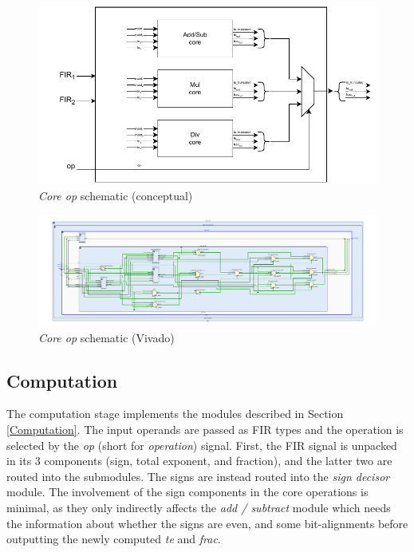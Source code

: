 \begin{figure}
    \centering
        \centering
        \includegraphics[width=\textwidth]{figures/core_op.drawio.pdf}
        \caption{\textit{Core op} schematic (conceptual)}
        \label{fig:core_op_ppu_schematic}
\end{figure}   


\begin{figure}
        \centering
        \includegraphics[width=\textwidth]{figures/core_op.vivado.pdf}
        \caption{\textit{Core op} schematic (Vivado)}
        \label{fig:core_op_ppu_schematic_vivado}
\end{figure}   




\subsection{Computation}


The computation stage implements the modules described in Section \ref{Computation}.
The input operands are passed as FIR types and the operation is selected by the \textit{op} (short for \textit{operation}) signal.
First, the FIR signal is unpacked in its 3 components (sign, total exponent, and fraction), and the latter two are routed into the submodules. The signs are instead routed into the \textit{sign decisor} module. The involvement of the sign components in the core operations is minimal, as they only indirectly affects the \textit{add / subtract} module which needs the information about whether the signs are even, and some bit-alignments before outputting the newly computed \textit{te} and \textit{frac}.





